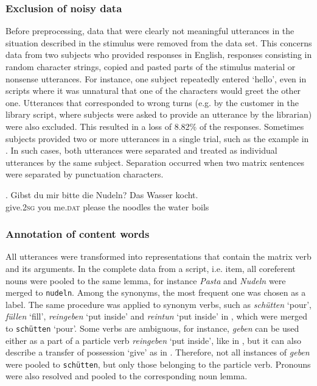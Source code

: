 \subsubsection{Exclusion of noisy data}
Before preprocessing, data that were clearly not meaningful utterances in the situation described in the stimulus were removed from the data set. This concerns data from two subjects who provided responses in English, responses consisting in random character strings, copied and pasted parts of the stimulus material or nonsense utterances. For instance, one subject repeatedly entered `hello', even in scripts where it was unnatural that one of the characters would greet the other one. Utterances that corresponded to wrong turns (e.g. by the customer in the library script, where subjects were asked to provide an utterance by the librarian) were also excluded. This resulted in a loss of 8.82\% of the responses. Sometimes subjects provided two or more utterances in a single trial, such as the example in \Next. In such cases, both utterances were separated and treated as individual utterances by the same subject. Separation occurred when two matrix sentences were separated by punctuation characters.

\exg. Gibst du mir bitte die Nudeln? Das Wasser kocht.\\
      give.\textsc{2sg} you me.\textsc{dat} please the noodles the water boils\\

\subsubsection{Annotation of content words}

All utterances were transformed into representations that contain the matrix verb and its arguments. In the complete data from a script, i.e. item, all coreferent nouns were pooled to the same lemma, for instance \textit{Pasta} and \textit{Nudeln} were merged to \texttt{nudeln}. Among the synonyms, the most frequent one was chosen as a label. The same procedure was applied to synonym verbs, such as \textit{schütten} `pour', \textit{füllen} `fill', \textit{reingeben} `put inside' and \textit{reintun} `put inside' in \LLast, which were merged to \texttt{schütten} `pour'. Some verbs are ambiguous, for instance, \textit{geben} can be used either as a part of a particle verb \textit{reingeben} `put inside', like in \LLast[d], but it can also describe a transfer of possession `give' as in \Last. Therefore, not all instances of \textit{geben} were pooled to \texttt{schütten}, but only those belonging to the particle verb. Pronouns were also resolved and pooled to the corresponding noun lemma.

